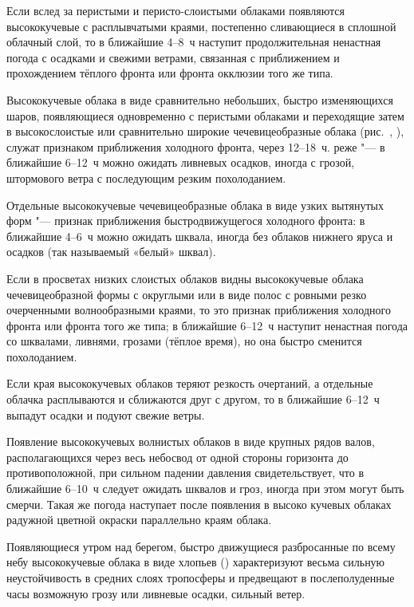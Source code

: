  Если вслед за перистыми и перисто-слоистыми облаками появляются
высококучевые с расплывчатыми краями, постепенно сливающиеся в
сплошной облачный слой, то в ближайшие 4--8~ч наступит
продолжительная ненастная погода с осадками и свежими ветрами,
связанная с приближением и прохождением тёплого фронта или фронта
окклюзии того же типа.

 Высококучевые облака в виде сравнительно небольших, быстро
изменяющихся шаров, появляющиеся одновременно с перистыми облаками и
переходящие затем в высокослоистые или сравнительно широкие
чечевицеобразные облака (рис.~,
), служат признаком приближения
холодного фронта, через 12--18~ч. реже "--- в ближайшие 6--12~ч можно
ожидать ливневых осадков, иногда с грозой, штормового ветра с
последующим резким похолоданием.

 Отдельные высококучевые чечевицеобразные облака в виде узких
вытянутых форм "--- признак приближения быстродвижущегося холодного
фронта: в ближайшие 4--6~ч можно ожидать шквала, иногда без
облаков нижнего яруса и осадков (так называемый «белый» шквал).

 Если в просветах низких слоистых облаков видны высококучевые
облака чечевицеобразной формы с округлыми или в виде полос с ровными
резко очерченными волнообразными краями, то это признак приближения
холодного фронта или фронта того же типа; в ближайшие 6--12~ч наступит
ненастная погода со шквалами, ливнями, грозами (тёплое время), но она
быстро сменится похолоданием.

 Если края высококучевых облаков теряют резкость очертаний, а
отдельные облачка расплываются и сближаются друг с другом, то в
ближайшие 6--12~ч выпадут осадки и подуют свежие ветры.

 Появление высококучевых волнистых облаков в виде крупных рядов
валов, располагающихся через весь небосвод от одной стороны горизонта
до противоположной, при сильном падении давления свидетельствует, что
в ближайшие 6--10~ч следует ожидать шквалов и гроз, иногда при этом
могут быть смерчи. Такая же погода наступает после появления в высоко
кучевых облаках радужной цветной окраски параллельно краям облака.

 Появляющиеся утром над берегом, быстро движущиеся разбросанные по
всему небу высококучевые облака в виде хлопьев () характеризуют
весьма сильную неустойчивость в средних слоях тропосферы и предвещают
в послеполуденные часы возможную грозу или ливневые осадки, сильный
ветер.

